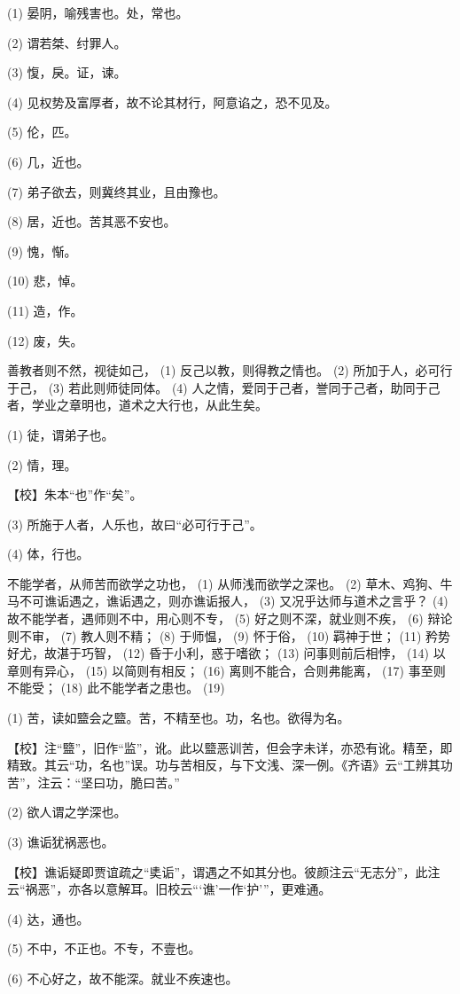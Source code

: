 \documentclass[12pt,UTF8]{ctexbook}
\begin{document}
(1) 晏阴，喻残害也。处，常也。

(2) 谓若桀、纣罪人。

(3) 愎，戾。证，谏。

(4) 见权势及富厚者，故不论其材行，阿意谄之，恐不见及。

(5) 伦，匹。

(6) 几，近也。

(7) 弟子欲去，则冀终其业，且由豫也。

(8) 居，近也。苦其恶不安也。

(9) 愧，惭。

(10) 悲，悼。

(11) 造，作。

(12) 废，失。

善教者则不然，视徒如己， (1) 反己以教，则得教之情也。 (2) 所加于人，必可行于己， (3) 若此则师徒同体。 (4) 人之情，爱同于己者，誉同于己者，助同于己者，学业之章明也，道术之大行也，从此生矣。

(1) 徒，谓弟子也。

(2) 情，理。

【校】朱本“也”作“矣”。

(3) 所施于人者，人乐也，故曰“必可行于己”。

(4) 体，行也。

不能学者，从师苦而欲学之功也， (1) 从师浅而欲学之深也。 (2) 草木、鸡狗、牛马不可谯诟遇之，谯诟遇之，则亦谯诟报人， (3) 又况乎达师与道术之言乎？ (4) 故不能学者，遇师则不中，用心则不专， (5) 好之则不深，就业则不疾， (6) 辩论则不审， (7) 教人则不精； (8) 于师愠， (9) 怀于俗， (10) 羁神于世； (11) 矜势好尤，故湛于巧智， (12) 昏于小利，惑于嗜欲； (13) 问事则前后相悖， (14) 以章则有异心， (15) 以简则有相反； (16) 离则不能合，合则弗能离， (17) 事至则不能受； (18) 此不能学者之患也。 (19)

(1) 苦，读如盬会之盬。苦，不精至也。功，名也。欲得为名。

【校】注“盬”，旧作“监”，讹。此以盬恶训苦，但会字未详，亦恐有讹。精至，即精致。其云“功，名也”误。功与苦相反，与下文浅、深一例。《齐语》云“工辨其功苦”，注云：“坚曰功，脆曰苦。”

(2) 欲人谓之学深也。

(3) 谯诟犹祸恶也。

【校】谯诟疑即贾谊疏之“奊诟”，谓遇之不如其分也。彼颜注云“无志分”，此注云“祸恶”，亦各以意解耳。旧校云“‘谯’一作‘护’”，更难通。

(4) 达，通也。

(5) 不中，不正也。不专，不壹也。

(6) 不心好之，故不能深。就业不疾速也。
\end{document}
